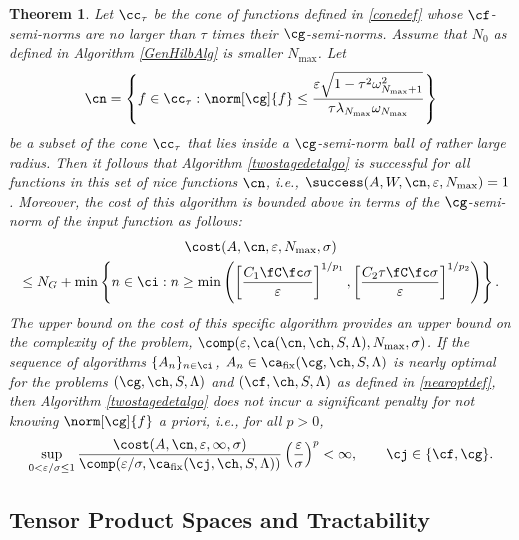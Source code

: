 \documentclass[final]{elsarticle}
\newtheorem{theorem}{Theorem}
\theoremstyle{definition}
\theoremstyle{remark}
\DeclareMathOperator{\fix}{fix}
\begin{document}
\begin{theorem}
Let $\cc_\tau$ be the cone of functions defined in \eqref{conedef} whose $\cf$-semi-norms are no larger than $\tau$ times their $\cg$-semi-norms.  Assume that $N_0$ as defined in Algorithm \ref{GenHilbAlg} is smaller $N_{\max}$.  Let
\begin{equation} \label{nicefHilbdef}
\cn = \left \{ f \in \cc_\tau : \norm[\cg]{f} \le \frac{\varepsilon \sqrt{1 - \tau^2 \omega_{N_{\max}+1}^2}}{\tau \lambda_{N_{\max}} \omega_{N_{\max}}} \right\}
\end{equation}
be a subset of the cone $\cc_\tau$ that lies inside a $\cg$-semi-norm ball of rather large radius.  Then it follows that Algorithm \ref{twostagedetalgo} is successful for all functions in this set of \emph{nice} functions $\cn$,  i.e.,  $\success(A,W,\cn,\varepsilon,N_{\max}) = 1$.  Moreover, the cost of this algorithm is bounded above in terms of the $\cg$-semi-norm of the input function as follows:
\begin{multline} \label{auto2stagedetcost}
\cost(A,\cn,\varepsilon,N_{\max},\sigma) \\
\le N_G+ \min\left\{ n \in \ci : n \ge \min\left( \left[\frac{C_1 \fC \fc \sigma }{\varepsilon}\right]^{1/p_1}, \left[\frac{C_2 \tau \fC \fc \sigma}{\varepsilon}\right]^{1/p_2} \right ) \right\}.
\end{multline}
The upper bound on the cost of this specific algorithm provides an upper bound on the complexity of the problem, $\comp(\varepsilon,\ca(\cn,\ch,S,\Lambda),N_{\max},\sigma)$.  If the sequence of algorithms $\{A_n\}_{n \in \ci}$, $A_n \in\ca_{\fix}(\cg,\ch,S,\Lambda)$  is nearly optimal for the problems $(\cg,\ch,S,\Lambda)$ and $(\cf,\ch,S,\Lambda)$ as defined in \eqref{nearoptdef}, then Algorithm \ref{twostagedetalgo} does not incur a significant penalty for not knowing $\norm[\cg]{f}$ a priori, i.e., for all $p>0$,
\begin{equation*}
\sup_{0 < \varepsilon/\sigma \le 1} \frac{\cost(A,\cn,\varepsilon,\infty,\sigma)} {\comp(\varepsilon/\sigma,\ca_{\fix}(\cj,\ch,S,\Lambda))} \left(\frac{\varepsilon}{\sigma}\right)^p <\infty, \qquad \cj \in \{\cf,\cg\}.
\end{equation*}

\end{theorem}

\subsection{Tensor Product Spaces and Tractability}
\end{document}
